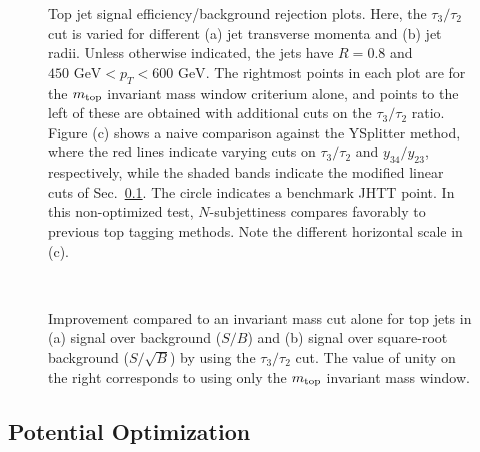 \documentclass{JHEP3}
\newcommand{\vsh}{\vspace{-.5cm}}
\DeclareRobustCommand{\Sec}[1]{Sec.~\ref{#1}}
\begin{document}
\begin{figure}[tp]
  \begin{center}
  \end{center}
  \vsh
  \caption{Top jet signal efficiency/background rejection plots.  Here, the $\tau_3/\tau_2$ cut is varied for different (a) jet transverse momenta and (b) jet radii.  Unless otherwise indicated, the jets have $R= 0.8$ and $450 \text{ GeV} < p_T < 600 \text{ GeV}$.  The rightmost points in each plot are for the $m_{\rm top}$ invariant mass window criterium alone, and points to the left of these are obtained with additional cuts on the $\tau_3/\tau_2$ ratio.  Figure (c) shows a naive comparison against the YSplitter method, where the red lines indicate varying cuts on $\tau_3/\tau_2$ and $y_{34}/y_{23}$, respectively, while the shaded bands indicate the modified linear cuts of \Sec{sec:optimization}.  The circle indicates a benchmark JHTT point.  In this non-optimized test, $N$-subjettiness  compares favorably to previous top tagging methods.  Note the different horizontal scale in (c).}
  \label{fig:TopSigEff}
\end{figure}

\begin{figure}[tp]
  \begin{center}
      \\
  \end{center}
  \vsh
  \caption{Improvement compared to an invariant mass cut alone for top jets in (a) signal over background ($S/B$) and (b) signal over square-root background ($S/\sqrt{B}$) by using the $\tau_3/\tau_2$ cut. The value of unity on the right corresponds to using only the $m_{\rm top}$ invariant mass window.}
  \label{fig:TopSigImprov}
\end{figure}

\subsection{Potential Optimization}
\label{sec:optimization}
\end{document}
